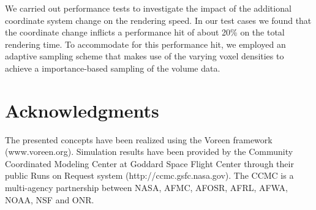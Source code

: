 \documentclass{egpubl}
\begin{document}
We carried out performance tests to investigate the impact of the additional coordinate system change on the rendering speed. In our test cases we found that the coordinate change inflicts a performance hit of about 20\% on the total rendering time. To accommodate for this performance hit, we employed an adaptive sampling scheme that makes use of the varying voxel densities to achieve a importance-based sampling of the volume data.

\section*{Acknowledgments}
The presented concepts have been realized using the Voreen framework (www.voreen.org). Simulation results have been provided by the Community Coordinated Modeling Center at Goddard Space Flight Center through their public Runs on Request system (http://ccmc.gsfc.nasa.gov). The CCMC is a multi-agency partnership between NASA, AFMC, AFOSR, AFRL, AFWA, NOAA, NSF and ONR.





\newpage


\end{document}
